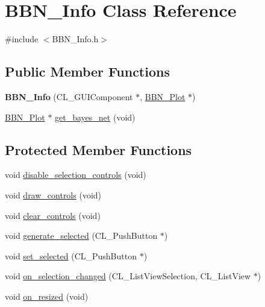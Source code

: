 \hypertarget{classBBN__Info}{
\section{BBN\_\-Info Class Reference}
\label{classBBN__Info}
}


{\ttfamily \#include $<$BBN\_\-Info.h$>$}

\subsection*{Public Member Functions}
\begin{DoxyCompactItemize}
\item 
\hypertarget{classBBN__Info_aacc7b6ff08c32b6cc0fcebca49392e90}{
{\bfseries BBN\_\-Info} (CL\_\-GUIComponent $\ast$, \hyperlink{classBBN__Plot}{BBN\_\-Plot} $\ast$)}
\label{classBBN__Info_aacc7b6ff08c32b6cc0fcebca49392e90}

\item 
\hyperlink{classBBN__Plot}{BBN\_\-Plot} $\ast$ \hyperlink{classBBN__Info_aa3b9ae5ed212e5122cf392fd57d37c9e}{get\_\-bayes\_\-net} (void)
\end{DoxyCompactItemize}
\subsection*{Protected Member Functions}
\begin{DoxyCompactItemize}
\item 
void \hyperlink{classBBN__Info_ae83184867ba4dbe1a3338f89ffcdce69}{disable\_\-selection\_\-controls} (void)
\item 
void \hyperlink{classBBN__Info_aecd443df0db694f38e8a4b735d06861a}{draw\_\-controls} (void)
\item 
void \hyperlink{classBBN__Info_a7845da935b0819e246cce5255f3bfb33}{clear\_\-controls} (void)
\item 
void \hyperlink{classBBN__Info_a636efdafc842f88c0646a1365da1413a}{generate\_\-selected} (CL\_\-PushButton $\ast$)
\item 
void \hyperlink{classBBN__Info_a046ddaf4d4c9a257a1c8af08e6c0e953}{set\_\-selected} (CL\_\-PushButton $\ast$)
\item 
void \hyperlink{classBBN__Info_a9c157837dfd23537abace10cad5ebac8}{on\_\-selection\_\-changed} (CL\_\-ListViewSelection, CL\_\-ListView $\ast$)
\item 
void \hyperlink{classBBN__Info_a9d5399c4ed1f2de0adb20cbaf49f1340}{on\_\-resized} (void)
\end{DoxyCompactItemize}
